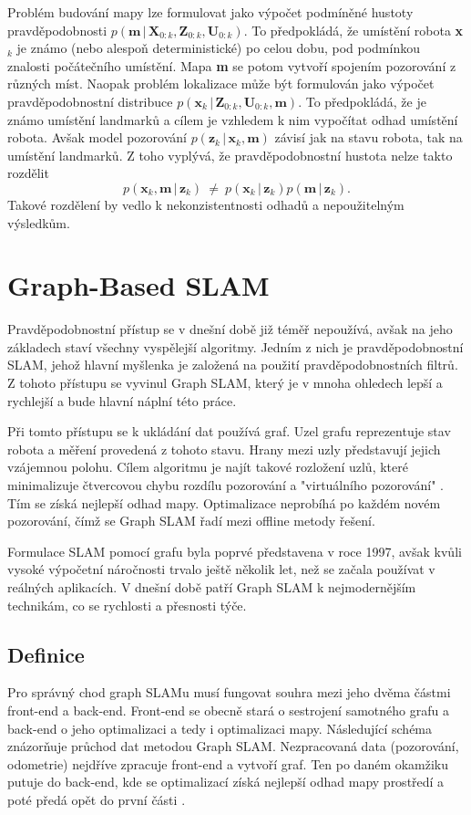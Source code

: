 \documentclass[12pt,a4paper]{article}
\begin{document}
Problém budování mapy lze formulovat jako výpočet podmíněné hustoty pravdě\-podobnosti $p(\textbf{m} \,|\, \textbf{X}_{0:k}, \textbf{Z}_{0:k}, \textbf{U}_{0:k})$. To předpokládá, že umístění robota \textbf{x}$_k$ je známo (nebo alespoň deterministické) po celou dobu, pod podmínkou znalosti počátečního umístění. Mapa \textbf{m} se potom vytvoří spojením pozorování z různých míst. Naopak problém lokalizace může být formulován jako výpočet pravděpodobnostní distribuce $p(\textbf{x}_k \,|\, \textbf{Z}_{0:k}, \textbf{U}_{0:k}, \textbf{m})$. To předpokládá, že je známo umístění landmarků a cílem je vzhledem k nim vypočítat odhad umístění robota. Avšak model pozorování $p(\textbf{z}_k \,|\, \textbf{x}_k, \textbf{m})$ závisí jak na stavu robota, tak na umístění landmarků. Z toho vyplývá, že pravděpodobnostní hustota nelze takto rozdělit
$$
p(\textbf{x}_k, \textbf{m} \,|\, \textbf{z}_k) \: \ne \: p(\textbf{x}_k \,|\, \textbf{z}_k)p(\textbf{m} \,|\, \textbf{z}_k).
$$
Takové rozdělení by vedlo k nekonzistentnosti odhadů a nepoužitelným výsledkům. 

\section{Graph-Based SLAM}
Pravděpodobnostní přístup se v dnešní době již téměř nepoužívá, avšak na jeho základech staví všechny vyspělejší algoritmy. Jedním z nich je pravděpodobnostní SLAM, jehož hlavní myšlenka je založená na použití pravděpodobnostních filtrů. Z tohoto přístupu se vyvinul Graph SLAM, který je v mnoha ohledech lepší a rychlejší a bude hlavní náplní této práce. 

Při tomto přístupu se k ukládání dat používá graf. Uzel grafu reprezentuje stav robota a měření provedená z tohoto stavu. Hrany mezi uzly představují jejich vzájemnou polohu. Cílem algoritmu je najít takové rozložení uzlů, které minimalizuje čtvercovou chybu rozdílu pozorování a "virtuálního pozorování" \cite{GraphSLAM}. Tím se získá nejlepší odhad mapy. Optimalizace neprobíhá po každém novém pozorování, čímž se Graph SLAM řadí mezi offline metody řešení.

Formulace SLAM pomocí grafu byla poprvé představena v roce 1997, avšak kvůli vysoké výpočetní náročnosti trvalo ještě několik let, než se začala používat v reálných aplikacích. V dnešní době patří Graph SLAM k nejmodernějším technikám, co se rychlosti a přesnosti týče.

\subsection{Definice}
Pro správný chod graph SLAMu musí fungovat souhra mezi jeho dvěma částmi front-end a back-end. Front-end se obecně stará o sestrojení samotného grafu a back-end o jeho optimalizaci a tedy i optimalizaci mapy. Následující schéma znázorňuje průchod dat metodou Graph SLAM. Nezpracovaná data (pozorování, odometrie) nejdříve zpracuje front-end a vytvoří graf. Ten po daném okamžiku putuje do back-end, kde se optimalizací získá nejlepší odhad mapy prostředí a poté předá opět do první části \cite{16-graph-slam}.
\end{document}
